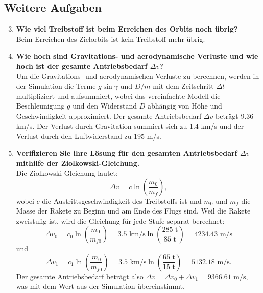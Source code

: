 \documentclass[12pt]{article}
\begin{document}
\subsection{Weitere Aufgaben}
\begin{enumerate}
    \setcounter{enumi}{2}
    \item  \textbf{Wie viel Treibstoff ist beim Erreichen des Orbits noch übrig?} \\
    Beim Erreichen des Zielorbits ist kein Treibstoff mehr übrig.
    \item \textbf{Wie hoch sind Gravitations- und aerodynamische Verluste und wie hoch ist der gesamte Antriebsbedarf $\Delta v$?} \\
    Um die Gravitations- und aerodynamischen Verluste zu berechnen, werden in der Simulation die Terme $g \sin \gamma$ und $D/m$ mit dem Zeitschritt $\Delta t$ multipliziert und aufsummiert, wobei das vereinfachte Modell die Beschleunigung $g$ und den Widerstand $D$ abhängig von Höhe und Geschwindigkeit approximiert. Der gesamte Antriebsbedarf $\Delta v$ beträgt 9.36 km/s. Der Verlust durch Gravitation summiert sich zu 1.4 km/s und der Verlust durch den Luftwiderstand zu 195 m/s.
    \item \textbf{Verifizieren Sie ihre Lösung für den gesamten Antriebsbedarf $\Delta v$ mithilfe der Ziolkowski-Gleichung.} \\
    Die Ziolkowski-Gleichung lautet:
    \begin{equation}
        \Delta v = c \ln \left( \frac{m_0}{m_f} \right),
    \end{equation} 
    wobei $c$ die Austrittsgeschwindigkeit des Treibstoffs ist und $m_0$ und $m_f$ die Masse der Rakete zu Beginn und am Ende des Flugs sind. Weil die Rakete zweistufig ist, wird die Gleichung für jede Stufe separat berechnet:
    \begin{equation}
        \Delta v_0 = c_0 \ln \left( \frac{m_0}{m_{f0}} \right) = 3.5 \text{ km/s} \ln \left( \frac{285 \text{ t}}{85 \text{ t}} \right) = 4234.43 \text{ m/s}
    \end{equation}
    und
    \begin{equation}
        \Delta v_1 = c_1 \ln \left( \frac{m_0}{m_{f0}} \right) = 3.5 \text{ km/s} \ln \left( \frac{65 \text{ t}}{15 \text{ t}} \right) = 5132.18 \text{ m/s}.
    \end{equation}
    Der gesamte Antriebsbedarf beträgt also $\Delta v = \Delta v_0 + \Delta v_1 =  9366.61 \text{ m/s}$, was mit dem Wert aus der Simulation übereinstimmt.


\end{enumerate}
\end{document}
